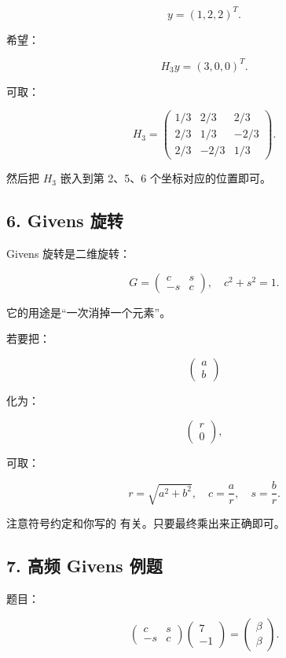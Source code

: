 \documentclass[11pt,a4paper]{ctexart}
\newcommand{\code}[1]{\begingroup\ttfamily\small #1\endgroup}
\begin{document}
\[
y=(1,2,2)^T.
\]

希望：

\[
H_3y=(3,0,0)^T.
\]

可取：

\[
H_3=
\begin{pmatrix}
1/3&2/3&2/3\\
2/3&1/3&-2/3\\
2/3&-2/3&1/3
\end{pmatrix}.
\]

然后把 $H_3$ 嵌入到第 2、5、6 个坐标对应的位置即可。


\subsection*{6. Givens 旋转}


Givens 旋转是二维旋转：

\[
G=
\begin{pmatrix}
c&s\\
-s&c
\end{pmatrix},\quad c^2+s^2=1.
\]

它的用途是“一次消掉一个元素”。

若要把：

\[
\begin{pmatrix}a\\b\end{pmatrix}
\]

化为：

\[
\begin{pmatrix}r\\0\end{pmatrix},
\]

可取：

\[
r=\sqrt{a^2+b^2},\quad c=\frac a r,\quad s=\frac b r.
\]

注意符号约定和你写的 \code{} 有关。只要最终乘出来正确即可。


\subsection*{7. 高频 Givens 例题}


题目：

\[
\begin{pmatrix}c&s\\-s&c\end{pmatrix}
\begin{pmatrix}7\\-1\end{pmatrix}
=
\begin{pmatrix}\beta\\\beta\end{pmatrix}.
\]
\end{document}
